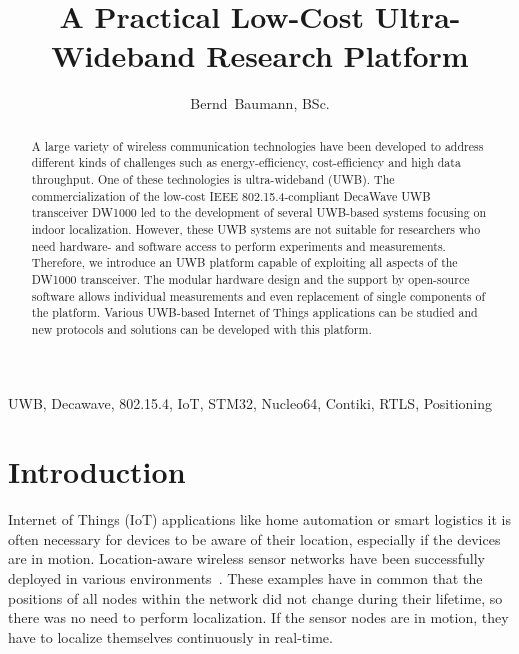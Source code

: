 \documentclass[journal,comsoc]{IEEEtran}
\begin{document}
\title{A Practical Low-Cost Ultra-Wideband Research Platform}

\author{Bernd~Baumann, BSc.
}

%
{}

\maketitle

\begin{abstract}
A large variety of wireless communication technologies have been developed
to address different kinds of challenges such as energy-efficiency, cost-efficiency and high data throughput. 
One of these technologies is ultra-wideband (UWB). 
The commercialization of the low-cost IEEE 802.15.4-compliant DecaWave UWB transceiver DW1000 led to the development of several UWB-based systems focusing on indoor localization. 
However, these UWB systems are not suitable for researchers who need hardware- and software access to perform experiments and measurements.
Therefore, we introduce an UWB platform capable of exploiting all aspects of the DW1000 transceiver. 
The modular hardware design and the support by open-source software allows individual measurements and even replacement of single components of the platform.
Various UWB-based Internet of Things applications can be studied and new protocols and solutions can be developed with this platform. 
\end{abstract}

\begin{IEEEkeywords}
UWB, Decawave, 802.15.4, IoT, STM32, Nucleo64, Contiki, RTLS, Positioning
\end{IEEEkeywords}


\IEEEpeerreviewmaketitle


\section{Introduction}
\label{sec:introduction}
 Internet of Things (IoT) applications like home automation or smart logistics it is often necessary for devices to be aware of their location, especially if the devices are in motion. 
Location-aware wireless sensor networks have been successfully deployed in various environments~\cite{cane_toad, volcano, tunnel}. 
These examples have in common that the positions of all nodes within the network did not change during their lifetime, so there was no need to perform localization. 
If the sensor nodes are in motion, they have to localize themselves continuously in real-time. 
\end{document}
